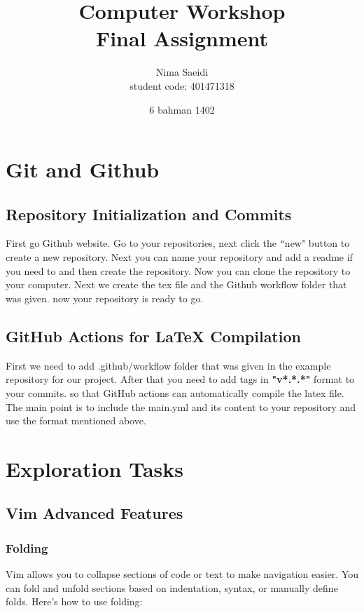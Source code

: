 \documentclass[titlepage]{article}
\title{\textbf{Computer Workshop\\ Final Assignment}}
\author{Nima Saeidi \\ student code: 401471318}
\date{6 bahman 1402}
\begin{document}
\maketitle
\tableofcontents

\newpage

\section{Git and Github}
\subsection{Repository Initialization and Commits}
First go Github website. Go to your repositories, next click the \texttt"new" button to create a new repository. Next you can name your repository and add a readme if you need to and then create the repository. Now you can clone the repository to your computer. Next we create the tex file and the Github workflow folder that was given. now your repository is ready to go.

\subsection{GitHub Actions for LaTeX Compilation}
First we need to add .github/workflow folder that was given in the example repository for our project. After that you need to add tags in \textbf{"v*.*.*"} format to your commits. so that GitHub actions can automatically compile the latex file. The main point is to include the main.yml and its content to your repository and use the format mentioned above.


\section{Exploration Tasks}
\subsection{Vim Advanced Features}
\subsubsection{Folding}
Vim allows you to collapse sections of code or text to make navigation easier. You can fold and unfold sections based on indentation, syntax, or manually define folds. Here's how to use folding:
\end{document}
